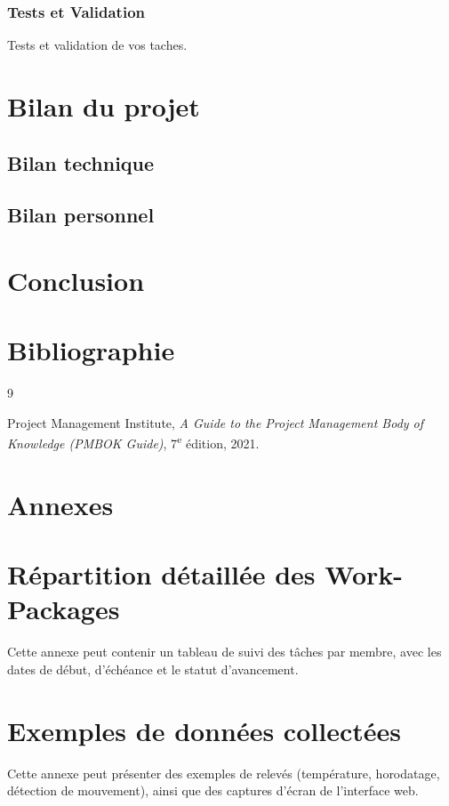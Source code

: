 ﻿\documentclass[11pt]{article}
\begin{document}
\subsubsection{Tests et Validation}
Tests et validation de vos taches.


\section{Bilan du projet}
\subsection{Bilan technique}
\subsection{Bilan personnel}

\section{Conclusion}

\clearpage
\section*{Bibliographie}
\begin{thebibliography}{9}

Project Management Institute,
\textit{A Guide to the Project Management Body of Knowledge (PMBOK Guide)},
7\textsuperscript{e} édition, 2021.


\end{thebibliography}

\clearpage
\appendix
\section*{Annexes}
\section{Répartition détaillée des Work-Packages}
Cette annexe peut contenir un tableau de suivi des tâches par membre, avec les dates de début, d'échéance et le statut d'avancement.

\section{Exemples de données collectées}
Cette annexe peut présenter des exemples de relevés (température, horodatage, détection de mouvement), ainsi que des captures d'écran de l'interface web.
\end{document}
